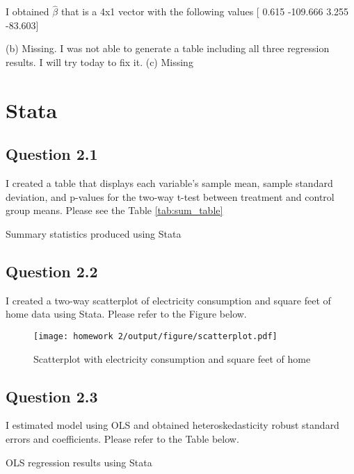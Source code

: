 \documentclass{article}
\begin{document}
I obtained \(\hat{\beta}\) that is a 4x1 vector with the following values [   0.615 -109.666  3.255 -83.603]

(b) Missing.  I was not able to generate a table including all three regression results. I will try today to fix it. 
(c) Missing

\FloatBarrier
\section*{Stata}

\subsection*{Question 2.1}

I created a table that displays each variable’s sample mean, sample standard deviation, and p-values for the two-way t-test between treatment and control group means. Please see the Table \ref{tab:sum_table}


\begin{table}[hbt!]
    \centering
    
    \caption{Summary statistics produced using Stata}
    \label{tab:sum_table}
\end{table}

\subsection*{Question 2.2}

I created a two-way scatterplot of electricity consumption and square feet of home data using Stata. Please refer to the Figure below.

\begin{figure}[hbt!]
    \centering
    \texttt{[image: homework 2/output/figure/scatterplot.pdf]}
    \caption{Scatterplot with electricity consumption and square feet of home}
    \label{tab:scatter}
\end{figure}

\FloatBarrier
\subsection*{Question 2.3}
I estimated model using OLS and obtained heteroskedasticity robust standard errors and coefficients. Please refer to the Table below. 

\begin{table}[hbt!]
    \centering
    
    \caption{OLS regression results using Stata}
     \label{tab:robust_table}
  \end{table}
\end{document}

